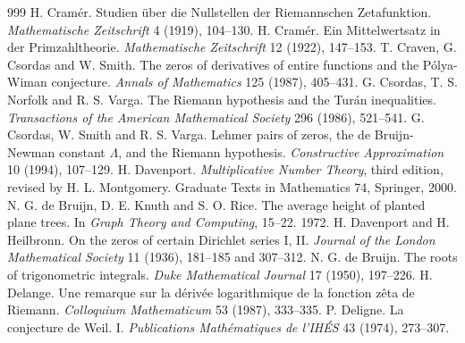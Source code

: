 \begin{thebibliography}{999}
 H. Cram\'er. Studien \"uber die Nullstellen der Riemannschen Zetafunktion. \emph{Mathematische Zeitschrift} 4 (1919), 104--130.
 H. Cram\'er. Ein Mittelwertsatz in der Primzahltheorie. \emph{Mathematische Zeitschrift} 12 (1922), 147--153.
 T. Craven, G. Csordas and W. Smith. The zeros of derivatives of entire functions and the P\'olya-Wiman conjecture. \emph{Annals of Mathematics} 125 (1987), 405--431.
 G. Csordas, T. S. Norfolk and R. S. Varga. The Riemann hypothesis and the Tur\'an inequalities. \emph{Transactions of the American Mathematical Society} 296 (1986), 521--541.
 G. Csordas, W. Smith and R. S. Varga. Lehmer pairs of zeros, the de Bruijn-Newman constant $\Lambda$, and the Riemann hypothesis. \emph{Constructive Approximation} 10 (1994), 107--129.
 H. Davenport. \emph{Multiplicative Number Theory}, third edition, revised by H. L. Montgomery. Graduate Texts in Mathematics 74, Springer, 2000.
 N. G. de Bruijn, D. E. Knuth and S. O. Rice. The average height of planted plane trees. In \emph{Graph Theory and Computing}, 15--22. 1972.
 H. Davenport and H. Heilbronn. On the zeros of certain Dirichlet series I, II. \emph{Journal of the London Mathematical Society} 11 (1936), 181--185 and 307--312.
 N. G. de Bruijn. The roots of trigonometric integrals. \emph{Duke Mathematical Journal} 17 (1950), 197--226.
 H. Delange. Une remarque sur la d\'eriv\'ee logarithmique de la fonction z\^eta de Riemann. \emph{Colloquium Mathematicum} 53 (1987), 333--335.
 P. Deligne. La conjecture de Weil. I. \emph{Publications Math\'ematiques de l'IH\'ES} 43 (1974), 273--307.

\end{thebibliography}
